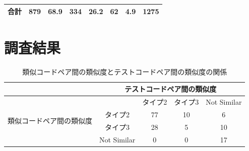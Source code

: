 \documentclass{fose2019}           %
\begin{document}
\begin{table}[]
\begin{tabular}{|c|p{2.5em}|c|p{4em}|c|p{3.5em}|c|c|c|}
{\scriptsize 合計}                      & {\scriptsize \hfil 879 \hfil}                & {\scriptsize 68.9}                & {\scriptsize \hfil 334 \hfil}                      & {\scriptsize 26.2}                     & {\scriptsize \hfil 62 \hfil}                     & {\scriptsize 4.9}                    & \multicolumn{2}{c|}{\scriptsize 1275} \\ \hline
\end{tabular}
\end{table}


\section{調査結果}




\begin{table}[]
\centering
\caption{類似コードペア間の類似度とテストコードペア間の類似度の関係}
\label{table2}
\begin{tabular}{|c|c|c|c|c|}
\hline
                             & \multicolumn{4}{c|}{\scriptsize テストコードペア間の類似度}         \\ \hline
\multirow{4}{*}{\scriptsize 類似コードペア間の類似度} &             & \scriptsize タイプ2 & \scriptsize タイプ3 & \scriptsize Not Similar \\ \cline{2-5} 
                             & \scriptsize タイプ2 & \scriptsize 77          & \scriptsize 10     & \scriptsize 6     \\ \cline{2-5} 
                             &\scriptsize タイプ3       & \scriptsize 28           & \scriptsize 5    & \scriptsize 10    \\ \cline{2-5} 
                             & \scriptsize Not Similar       & \scriptsize 0           & \scriptsize 0    & \scriptsize 17     \\ \hline
\end{tabular}
\end{table}
\end{document}
